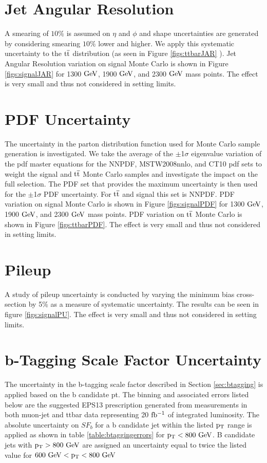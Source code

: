\section{Jet Angular Resolution}
A smearing of $10\%$ is assumed on $\eta$ and $\phi$ and shape uncertainties are generated by considering smearing $10\%$ 
lower and higher. We apply this systematic uncertainty to the $\mathrm{t\overline{t}}$ distribution (as seen in Figure \ref{figs:ttbarJAR} ). Jet Angular Resolution 
variation on signal Monte Carlo is shown in Figure \ref{figs:signalJAR} for 1300$~\mathrm{GeV}$,
 1900$~\mathrm{GeV}$, and 2300$~\mathrm{GeV}$ mass points.  The effect is very small and thus not considered in setting limits.

\section{PDF Uncertainty}
The uncertainty in the parton distribution function used for Monte Carlo sample generation is investigated.  We take the average of the $\pm$1$\sigma$ eigenvalue 
variation of the pdf master equations \cite{Bourilkov:2006cj} 
for the NNPDF, MSTW2008nnlo, and CT10 pdf sets to weight the signal and $\mathrm{t\overline{t}}$ Monte Carlo samples and investigate the impact on the full selection.  The PDF set 
that provides the maximum uncertainty is then used for the $\pm$1$\sigma$ PDF uncertainty.  For $\mathrm{t\overline{t}}$ and signal this set is NNPDF. PDF 
variation on signal Monte Carlo is shown in Figure \ref{figs:signalPDF} for 1300$~\mathrm{GeV}$,
 1900$~\mathrm{GeV}$, and 2300$~\mathrm{GeV}$ mass points.  PDF variation on $\mathrm{t\overline{t}}$ Monte Carlo is shown in Figure \ref{figs:ttbarPDF}.  The effect is very small and thus not considered in setting limits.

\section{Pileup}
A study of pileup uncertainty is conducted by varying the minimum bias cross-section by 5\% as a measure of systematic uncertainty.  The results 
can be seen in figure \ref{figs:signalPU}.  The effect is very small and thus not considered in setting limits.

\section{b-Tagging Scale Factor Uncertainty}
\label{sec:btagunc}
The uncertainty in the b-tagging scale factor described in Section \ref{sec:btagging} is applied based on the b candidate pt.  The binning and associated errors 
listed below are the suggested EPS13 prescription generated from measurements in both muon-jet and ttbar data representing 20$~\mathrm{fb^{-1}}$ of integrated 
luminosity.  The absolute uncertainty on $SF_b$ for a b candidate jet within the listed $\mathrm{p_{T}}$ range is applied as shown in table \ref{table:btaggingerrors} 
for $\mathrm{p_{T}} < 800~\mathrm{GeV}$.  B candidate jets with $\mathrm{p_{T}} > 800~\mathrm{GeV}$ are assigned an uncertainty equal to twice the listed value for $600~\mathrm{GeV} < \mathrm{p_{T}} < 800~\mathrm{GeV}$

